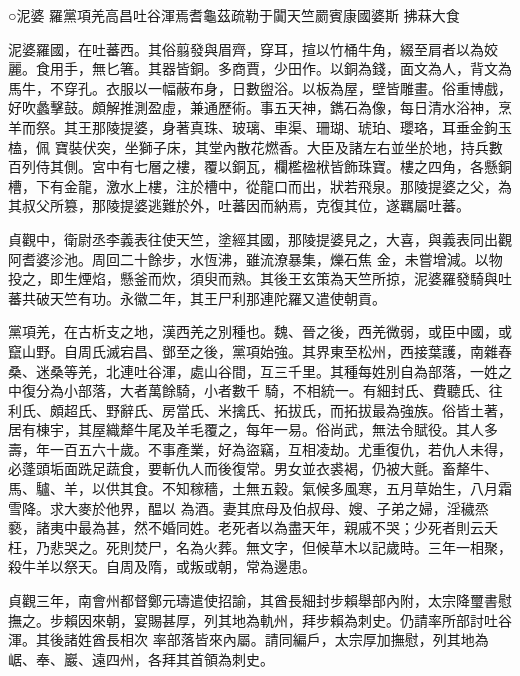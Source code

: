 
\begin{pinyinscope}

 ○泥婆
 羅黨項羌高昌吐谷渾焉耆龜茲疏勒于闐天竺罽賓康國婆斯
 拂菻大食



 泥婆羅國，在吐蕃西。其俗翦發與眉齊，穿耳，揎以竹桶牛角，綴至肩者以為姣麗。食用手，無匕箸。其器皆銅。多商賈，少田作。以銅為錢，面文為人，背文為馬牛，不穿孔。衣服以一幅蔽布身，日數盥浴。以板為屋，壁皆雕畫。俗重博戲，好吹蠡擊鼓。頗解推測盈虛，兼通歷術。事五天神，鐫石為像，每日清水浴神，烹羊而祭。其王那陵提婆，身著真珠、玻璃、車渠、珊瑚、琥珀、瓔珞，耳垂金鉤玉榼，佩
 寶裝伏突，坐獅子床，其堂內散花燃香。大臣及諸左右並坐於地，持兵數百列侍其側。宮中有七層之樓，覆以銅瓦，欄檻楹栿皆飾珠寶。樓之四角，各懸銅槽，下有金龍，激水上樓，注於槽中，從龍口而出，狀若飛泉。那陵提婆之父，為其叔父所篡，那陵提婆逃難於外，吐蕃因而納焉，克復其位，遂羈屬吐蕃。



 貞觀中，衛尉丞李義表往使天竺，塗經其國，那陵提婆見之，大喜，與義表同出觀阿耆婆沴池。周回二十餘步，水恆沸，雖流潦暴集，爍石焦
 金，未嘗增減。以物投之，即生煙焰，懸釜而炊，須臾而熟。其後王玄策為天竺所掠，泥婆羅發騎與吐蕃共破天竺有功。永徽二年，其王尸利那連陀羅又遣使朝貢。



 黨項羌，在古析支之地，漢西羌之別種也。魏、晉之後，西羌微弱，或臣中國，或竄山野。自周氏滅宕昌、鄧至之後，黨項始強。其界東至松州，西接葉護，南雜舂桑、迷桑等羌，北連吐谷渾，處山谷間，互三千里。其種每姓別自為部落，一姓之中復分為小部落，大者萬餘騎，小者數千
 騎，不相統一。有細封氏、費聽氏、往利氏、頗超氏、野辭氏、房當氏、米擒氏、拓拔氏，而拓拔最為強族。俗皆土著，居有棟宇，其屋織犛牛尾及羊毛覆之，每年一易。俗尚武，無法令賦役。其人多壽，年一百五六十歲。不事產業，好為盜竊，互相凌劫。尤重復仇，若仇人未得，必蓬頭垢面跣足蔬食，要斬仇人而後復常。男女並衣裘褐，仍被大氈。畜犛牛、馬、驢、羊，以供其食。不知稼穡，土無五穀。氣候多風寒，五月草始生，八月霜雪降。求大麥於他界，醖以
 為酒。妻其庶母及伯叔母、嫂、子弟之婦，淫穢烝褻，諸夷中最為甚，然不婚同姓。老死者以為盡天年，親戚不哭；少死者則云夭枉，乃悲哭之。死則焚尸，名為火葬。無文字，但候草木以記歲時。三年一相聚，殺牛羊以祭天。自周及隋，或叛或朝，常為邊患。



 貞觀三年，南會州都督鄭元璹遣使招諭，其酋長細封步賴舉部內附，太宗降璽書慰撫之。步賴因來朝，宴賜甚厚，列其地為軌州，拜步賴為刺史。仍請率所部討吐谷渾。其後諸姓酋長相次
 率部落皆來內屬。請同編戶，太宗厚加撫慰，列其地為崌、奉、巖、遠四州，各拜其首領為刺史。




\end{pinyinscope}
